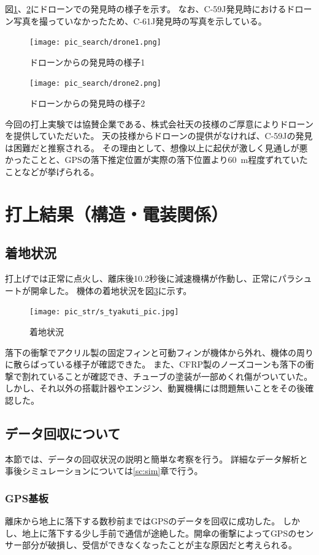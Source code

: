 \documentclass[a4paper,11pt,uplatex]{jsarticle}
\begin{document}
図\ref{fig:drone1}、\ref{fig:drone2}にドローンでの発見時の様子を示す。
なお、C-59J発見時におけるドローン写真を撮っていなかったため、C-61J発見時の写真を示している。

\begin{figure}[H]
	\centering
	\texttt{[image: pic\_search/drone1.png]}
	\caption{ドローンからの発見時の様子1}
	\label{fig:drone1}
\end{figure}

\begin{figure}[H]
	\centering
	\texttt{[image: pic\_search/drone2.png]}
	\caption{ドローンからの発見時の様子2}
	\label{fig:drone2}
\end{figure}

今回の打上実験では協賛企業である、株式会社天の技様のご厚意によりドローンを提供していただいた。
天の技様からドローンの提供がなければ、C-59Jの発見は困難だと推察される。
その理由として、想像以上に起伏が激しく見通しが悪かったことと、GPSの落下推定位置が実際の落下位置より\SI{60}{m}程度ずれていたことなどが挙げられる。

\newpage
\section{打上結果（構造・電装関係）}
\subsection{着地状況}
打上げでは正常に点火し、離床後10.2秒後に減速機構が作動し、正常にパラシュートが開傘した。
機体の着地状況を図\ref{s_tyakuti_pic}に示す。

\begin{figure}[H]
	\centering
	\texttt{[image: pic\_str/s\_tyakuti\_pic.jpg]}
	\caption{着地状況}
	\label{s_tyakuti_pic}
\end{figure}

落下の衝撃でアクリル製の固定フィンと可動フィンが機体から外れ、機体の周りに散らばっている様子が確認できた。
また、CFRP製のノーズコーンも落下の衝撃で割れていることが確認でき、チューブの塗装が一部めくれ傷がついていた。
しかし、それ以外の搭載計器やエンジン、動翼機構には問題無いことをその後確認した。


\subsection{データ回収について}
本節では、データの回収状況の説明と簡単な考察を行う。
詳細なデータ解析と事後シミュレーションについては\ref{sc:sim}章で行う。
\subsubsection{GPS基板}
離床から地上に落下する数秒前まではGPSのデータを回収に成功した。
しかし、地上に落下する少し手前で通信が途絶した。開傘の衝撃によってGPSのセンサー部分が破損し、受信ができなくなったことが主な原因だと考えられる。
\end{document}
